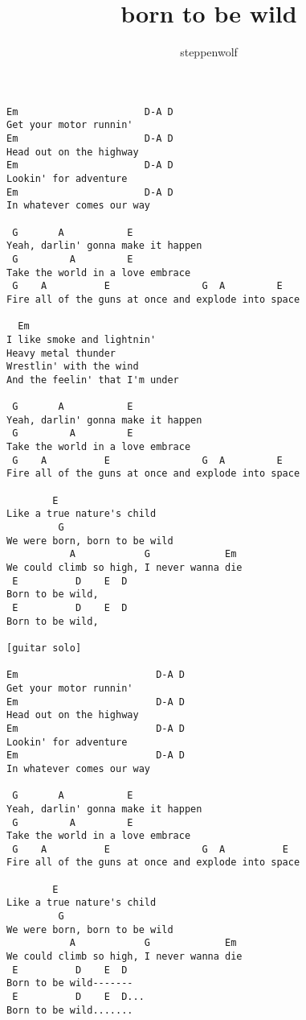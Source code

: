 \author{steppenwolf}
\title{born to be wild}
\maketitle
\begin{verbatim}   
Em                      D-A D
Get your motor runnin'
Em                      D-A D
Head out on the highway
Em                      D-A D
Lookin' for adventure
Em                      D-A D
In whatever comes our way

 G       A           E
Yeah, darlin' gonna make it happen
 G         A         E
Take the world in a love embrace
 G    A          E                G  A         E
Fire all of the guns at once and explode into space

  Em
I like smoke and lightnin'
Heavy metal thunder
Wrestlin' with the wind
And the feelin' that I'm under

 G       A           E
Yeah, darlin' gonna make it happen
 G         A         E
Take the world in a love embrace
 G    A          E                G  A         E
Fire all of the guns at once and explode into space

        E
Like a true nature's child
         G      
We were born, born to be wild
           A            G             Em
We could climb so high, I never wanna die
 E          D    E  D 
Born to be wild,
 E          D    E  D 
Born to be wild,

[guitar solo]

Em                        D-A D
Get your motor runnin'
Em                        D-A D
Head out on the highway
Em                        D-A D
Lookin' for adventure
Em                        D-A D
In whatever comes our way

 G       A           E
Yeah, darlin' gonna make it happen
 G         A         E
Take the world in a love embrace
 G    A          E                G  A          E
Fire all of the guns at once and explode into space

        E
Like a true nature's child
         G      
We were born, born to be wild
           A            G             Em
We could climb so high, I never wanna die
 E          D    E  D 
Born to be wild-------
 E          D    E  D... 
Born to be wild.......
\end{verbatim}
